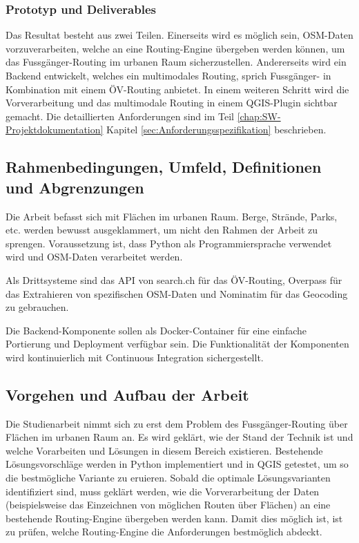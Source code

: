 \subsubsection{Prototyp und Deliverables}
\label{target:Prototyp und Deliverables}
Das Resultat besteht aus zwei Teilen. Einerseits wird es möglich sein, \ac{OSM}-Daten vorzuverarbeiten, welche an eine Routing-Engine übergeben werden können, um das Fussgänger-Routing im urbanen Raum sicherzustellen. Andererseits wird ein Backend entwickelt, welches ein multimodales Routing, sprich Fussgänger- in Kombination mit einem ÖV-Routing anbietet. In einem weiteren Schritt wird die Vorverarbeitung und das multimodale Routing in einem QGIS-Plugin sichtbar gemacht. Die detaillierten Anforderungen sind im Teil \ref{chap:SW-Projektdokumentation} Kapitel \ref{sec:Anforderungsspezifikation} beschrieben.
	
\subsection{Rahmenbedingungen, Umfeld, Definitionen und Abgrenzungen}
\label{Rahmenbedingungen, Umfeld, Definitionen, Abgrenzungen}
Die Arbeit befasst sich mit Flächen im urbanen Raum. Berge, Strände, Parks, etc. werden bewusst ausgeklammert, um nicht den Rahmen der Arbeit zu sprengen. Voraussetzung ist, dass Python als Programmiersprache verwendet wird und \ac{OSM}-Daten \cite{osm_data_switzerland} verarbeitet werden.

Als Drittsysteme sind das \ac{API} von search.ch \cite{search_ch_route_api} für das ÖV-Routing, Overpass \cite{wiki:overpass} für das Extrahieren von spezifischen \ac{OSM}-Daten und Nominatim \cite{nominatim_osm} für das \gls{Geocoding} zu gebrauchen.

Die Backend-Komponente sollen als Docker-Container für eine einfache Portierung und Deployment verfügbar sein. Die Funktionalität der Komponenten wird kontinuierlich mit Continuous Integration sichergestellt.

\subsection{Vorgehen und Aufbau der Arbeit}
\label{Vorgehen und Aufbau der Arbeit}
Die Studienarbeit nimmt sich zu erst dem Problem des Fussgänger-Routing über Flächen im urbanen Raum an. Es wird geklärt, wie der Stand der Technik ist und welche Vorarbeiten und Lösungen in diesem Bereich existieren. Bestehende Lösungsvorschläge werden in Python implementiert und in QGIS getestet, um so die bestmögliche Variante zu eruieren. Sobald die optimale Lösungsvarianten identifiziert sind, muss geklärt werden, wie die Vorverarbeitung der Daten (beispielsweise das Einzeichnen von möglichen Routen über Flächen) an eine bestehende Routing-Engine übergeben werden kann. Damit dies möglich ist, ist zu prüfen, welche Routing-Engine die Anforderungen bestmöglich abdeckt.

